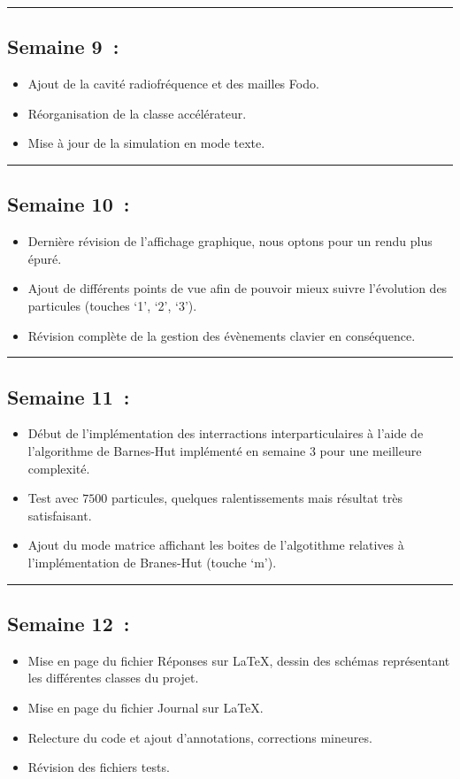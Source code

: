 \documentclass[12pt, letterpaper, twoside]{article}
\begin{document}
\rule{\textwidth}{0.4pt}

\subsection{Semaine 9 :}
\begin{itemize}
\item Ajout de la cavité radiofréquence et des mailles Fodo.
\item Réorganisation de la classe accélérateur.
\item Mise à jour de la simulation en mode texte.
\end{itemize}

\rule{\textwidth}{0.4pt}

\subsection{Semaine 10 :}
\begin{itemize}
\item Dernière révision de l’affichage graphique, nous optons pour un rendu plus épuré.
\item Ajout de différents points de vue afin de pouvoir mieux suivre l’évolution des particules (touches `1', `2', `3').
\item Révision complète de la gestion des évènements clavier en conséquence.
\end{itemize}

\rule{\textwidth}{0.4pt}

\subsection{Semaine 11 :}
\begin{itemize}
\item Début de l’implémentation des interractions interparticulaires à l’aide de l’algorithme de Barnes-Hut implémenté en semaine 3 pour une meilleure complexité.
\item Test avec $7500$ particules, quelques ralentissements mais résultat très satisfaisant.
\item Ajout du mode matrice affichant les boites de l’algotithme relatives à l'implémentation de Branes-Hut (touche `m').
\end{itemize}

\rule{\textwidth}{0.4pt}

\subsection{Semaine 12 :}
\begin{itemize}
\item Mise en page du fichier Réponses sur \LaTeX, dessin des schémas représentant les différentes classes du projet.
\item Mise en page du fichier Journal sur \LaTeX.
\item Relecture du code et ajout d’annotations, corrections mineures.
\item Révision des fichiers tests.
\end{itemize}
\end{document}
